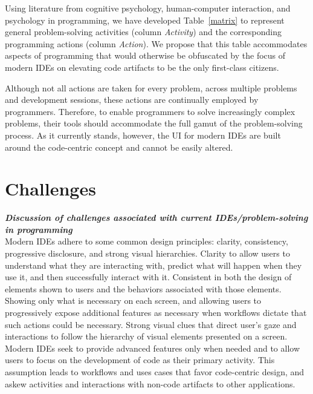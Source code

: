 \documentclass{ppig}
\newcommand{\bold}[1]{\textit{\textbf{\color{aoblue}#1}}}
\begin{document}
Using literature from cognitive psychology, human-computer interaction, and psychology in programming, we have developed Table~\ref{matrix} to represent general problem-solving activities (column \textit{Activity}) and the corresponding programming actions (column \textit{Action}).
We propose that this table accommodates aspects of programming that would otherwise be obfuscated by the focus of modern IDEs on elevating code artifacts to be the only first-class citizens.

Although not all actions are taken for every problem, across multiple problems and development sessions, these actions are continually employed by programmers.
Therefore, to enable programmers to solve increasingly complex problems, their tools should accommodate the full gamut of the problem-solving process.
As it currently stands, however, the UI for modern IDEs are built around the code-centric concept and cannot be easily altered.

\section{Challenges}
\bold{Discussion of challenges associated with current IDEs/problem-solving in programming\\}
Modern IDEs adhere to some common design principles: clarity, consistency, progressive disclosure, and strong visual hierarchies.
Clarity to allow users to understand what they are interacting with, predict what will happen when they use it, and then successfully interact with it.
Consistent in both the design of elements shown to users and the behaviors associated with those elements.
Showing only what is necessary on each screen, and allowing users to progressively expose additional features as necessary when workflows dictate that such actions could be necessary.
Strong visual clues that direct user's gaze and interactions to follow the hierarchy of visual elements presented on a screen.
Modern IDEs seek to provide advanced features only when needed and to allow users to focus on the development of code as their primary activity.
This assumption leads to workflows and uses cases that favor code-centric design, and askew activities and interactions with non-code artifacts to other applications.
\end{document}
